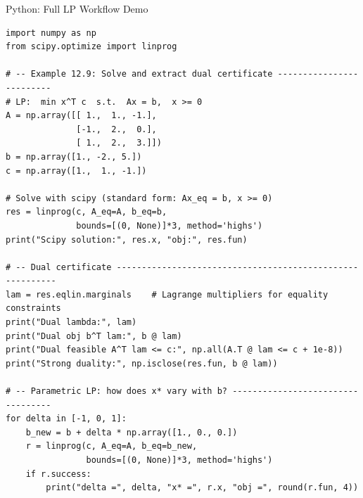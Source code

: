 \documentclass[aspectratio=169,10pt]{beamer}
\begin{document}
\begin{frame}[fragile]{Python: Full LP Workflow Demo}
\begin{lstlisting}
import numpy as np
from scipy.optimize import linprog

# -- Example 12.9: Solve and extract dual certificate -------------------------
# LP:  min x^T c  s.t.  Ax = b,  x >= 0
A = np.array([[ 1.,  1., -1.],
              [-1.,  2.,  0.],
              [ 1.,  2.,  3.]])
b = np.array([1., -2., 5.])
c = np.array([1.,  1., -1.])

# Solve with scipy (standard form: Ax_eq = b, x >= 0)
res = linprog(c, A_eq=A, b_eq=b,
              bounds=[(0, None)]*3, method='highs')
print("Scipy solution:", res.x, "obj:", res.fun)

# -- Dual certificate ----------------------------------------------------------
lam = res.eqlin.marginals    # Lagrange multipliers for equality constraints
print("Dual lambda:", lam)
print("Dual obj b^T lam:", b @ lam)
print("Dual feasible A^T lam <= c:", np.all(A.T @ lam <= c + 1e-8))
print("Strong duality:", np.isclose(res.fun, b @ lam))

# -- Parametric LP: how does x* vary with b? ----------------------------------
for delta in [-1, 0, 1]:
    b_new = b + delta * np.array([1., 0., 0.])
    r = linprog(c, A_eq=A, b_eq=b_new,
                bounds=[(0, None)]*3, method='highs')
    if r.success:
        print("delta =", delta, "x* =", r.x, "obj =", round(r.fun, 4))
\end{lstlisting}
\end{frame}
\end{document}
